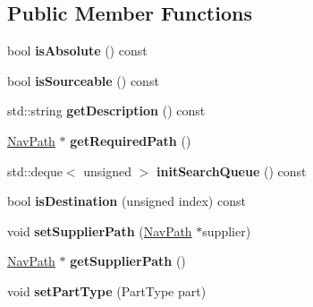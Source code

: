 \subsection*{Public Member Functions}
\begin{DoxyCompactItemize}
\item 
bool {\bfseries is\+Absolute} () const \hypertarget{classChainPathNode_a6121fdb1bed5cb13abd3dfbb4b36d9c2}{}\label{classChainPathNode_a6121fdb1bed5cb13abd3dfbb4b36d9c2}

\item 
bool {\bfseries is\+Sourceable} () const \hypertarget{classChainPathNode_aaf00c15e8d2058bb3580e0ad33d33ae6}{}\label{classChainPathNode_aaf00c15e8d2058bb3580e0ad33d33ae6}

\item 
std\+::string {\bfseries get\+Description} () const \hypertarget{classChainPathNode_afa682ac581e02d20cae1e74e8ec3a6de}{}\label{classChainPathNode_afa682ac581e02d20cae1e74e8ec3a6de}

\item 
\hyperlink{classNavPath}{Nav\+Path} $\ast$ {\bfseries get\+Required\+Path} ()\hypertarget{classChainPathNode_a8871216caebf21b9c6e2f25fe02bdae3}{}\label{classChainPathNode_a8871216caebf21b9c6e2f25fe02bdae3}

\item 
std\+::deque$<$ unsigned $>$ {\bfseries init\+Search\+Queue} () const \hypertarget{classChainPathNode_a38edf5973e60c7da59a5704a182f2ca0}{}\label{classChainPathNode_a38edf5973e60c7da59a5704a182f2ca0}

\item 
bool {\bfseries is\+Destination} (unsigned index) const \hypertarget{classChainPathNode_ad31edf6977ed8cc07ed73d0976070028}{}\label{classChainPathNode_ad31edf6977ed8cc07ed73d0976070028}

\item 
void {\bfseries set\+Supplier\+Path} (\hyperlink{classNavPath}{Nav\+Path} $\ast$supplier)\hypertarget{classChainPathNode_a99354429a2845014fc19a27c2889a21e}{}\label{classChainPathNode_a99354429a2845014fc19a27c2889a21e}

\item 
\hyperlink{classNavPath}{Nav\+Path} $\ast$ {\bfseries get\+Supplier\+Path} ()\hypertarget{classChainPathNode_a604c33fc6d7262b08393292f7c385f80}{}\label{classChainPathNode_a604c33fc6d7262b08393292f7c385f80}

\item 
void {\bfseries set\+Part\+Type} (Part\+Type part)\hypertarget{classChainPathNode_ac0940fb1aa9608e315c84b7ccf9ddfea}{}\label{classChainPathNode_ac0940fb1aa9608e315c84b7ccf9ddfea}


\end{DoxyCompactItemize}
